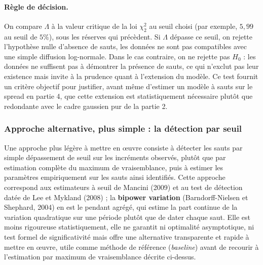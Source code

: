 \documentclass{article}
\begin{document}
\paragraph{Règle de décision.} On compare $\Lambda$ à la valeur critique de la loi $\chi^2_2$ au seuil choisi (par exemple, $5{,}99$ au seuil de $5\%$), sous les réserves qui précèdent. Si $\Lambda$ dépasse ce seuil, on rejette l'hypothèse nulle d'absence de sauts, les données ne sont pas compatibles avec une simple diffusion log-normale. Dans le cas contraire, on ne rejette pas $H_0$ : les données ne suffisent pas à démontrer la présence de sauts, ce qui n'exclut pas leur existence mais invite à la prudence quant à l'extension du modèle.
Ce test fournit un critère objectif pour justifier, avant même d'estimer un modèle à sauts sur le spread en partie 4, que cette extension est statistiquement nécessaire plutôt que redondante avec le cadre gaussien pur de la partie 2.
\subsubsection*{Approche alternative, plus simple : la détection par seuil}
Une approche plus légère à mettre en \oe uvre consiste à détecter les sauts par simple dépassement de seuil sur les incréments observés, plutôt que par estimation complète du maximum de vraisemblance, puis à estimer les paramètres empiriquement sur les sauts ainsi identifiés. Cette approche correspond aux estimateurs à seuil de Mancini (2009) et au test de détection datée de Lee et Mykland (2008) ; la \textbf{bipower variation} (Barndorff-Nielsen et Shephard, 2004) en est le pendant agrégé, qui estime la part continue de la variation quadratique sur une période plutôt que de dater chaque saut. Elle est moins rigoureuse statistiquement, elle ne garantit ni optimalité asymptotique, ni test formel de significativité mais offre une alternative transparente et rapide à mettre en \oe uvre, utile comme méthode de référence (\emph{baseline}) avant de recourir à l'estimation par maximum de vraisemblance décrite ci-dessus.
\end{document}

